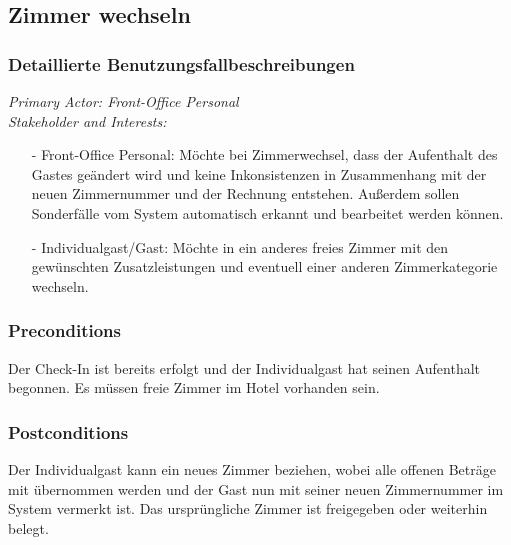 \documentclass[./detailed_overview_usecases.tex]{subfiles}
\begin{document}
    \subsection{Zimmer wechseln}
    \subsubsection{Detaillierte Benutzungsfallbeschreibungen}

    \textit{Primary Actor: Front-Office Personal}
    \\
    \textit{Stakeholder and Interests:}
    \begin{itemize}
        \item[-] Front-Office Personal: Möchte bei Zimmerwechsel, dass der Aufenthalt des Gastes geändert wird und keine Inkonsistenzen in Zusammenhang mit der neuen
        Zimmernummer und der Rechnung entstehen. Außerdem sollen Sonderfälle vom System automatisch erkannt und bearbeitet werden können.
        \item[-] Individualgast/Gast: Möchte in ein anderes freies Zimmer mit den gewünschten Zusatzleistungen und eventuell einer anderen Zimmerkategorie wechseln.
    \end{itemize}

    \subsubsection*{Preconditions}
    Der Check-In ist bereits erfolgt und der Individualgast hat seinen Aufenthalt begonnen. Es müssen freie Zimmer im Hotel vorhanden sein.

    \subsubsection*{Postconditions}
    Der Individualgast kann ein neues Zimmer beziehen, wobei alle offenen Beträge mit übernommen werden und der Gast nun mit
    seiner neuen Zimmernummer im System vermerkt ist. Das ursprüngliche Zimmer ist freigegeben oder weiterhin belegt.
\end{document}
